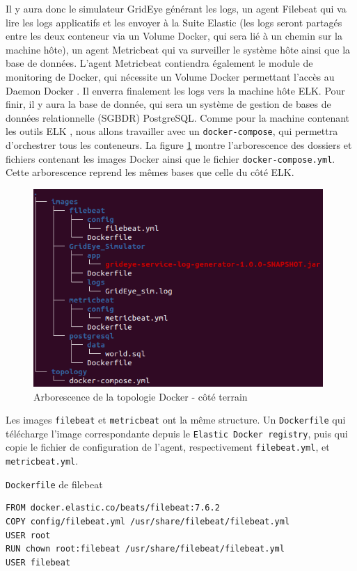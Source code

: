 \documentclass[paper=a4, fontsize=11pt]{scrartcl}
\begin{document}
Il y aura donc le simulateur GridEye générant les logs, un agent Filebeat qui va lire les logs applicatifs et les envoyer à la Suite Elastic (les logs seront partagés entre les deux conteneur via un Volume Docker, qui sera lié à un chemin sur la machine hôte), un agent Metricbeat qui va surveiller le système hôte ainsi que la base de données. L'agent Metricbeat contiendra également le module de monitoring de Docker, qui nécessite un Volume Docker permettant l'accès au \og Daemon Docker \fg. Il enverra finalement les logs vers la machine hôte ELK. Pour finir, il y aura la base de donnée, qui sera un système de gestion de bases de données relationnelle (SGBDR) PostgreSQL.
Comme pour la machine contenant les outils \og ELK \fg, nous allons travailler avec un \verb,docker-compose,, qui permettra d'orchestrer tous les conteneurs. La figure \ref{f-treeDockerField} montre l'arborescence des dossiers et fichiers contenant les images Docker ainsi que le fichier \verb,docker-compose.yml,. Cette arborescence reprend les mêmes bases que celle du côté ELK.

\begin{figure}[H]
    \centering
    \includegraphics[width=11cm]{img/screenshots/tree_docker_field.png}
    \caption{Arborescence de la topologie Docker - côté terrain}
    \label{f-treeDockerField}
\end{figure}

Les images \verb,filebeat, et \verb,metricbeat, ont la même structure. Un \verb,Dockerfile, qui télécharge l'image correspondante depuis le \verb,Elastic Docker registry,, puis qui copie le fichier de configuration de l'agent, respectivement \verb,filebeat.yml,, et \verb,metricbeat.yml,.

\verb,Dockerfile, de filebeat
\begin{lstlisting}
FROM docker.elastic.co/beats/filebeat:7.6.2
COPY config/filebeat.yml /usr/share/filebeat/filebeat.yml
USER root
RUN chown root:filebeat /usr/share/filebeat/filebeat.yml
USER filebeat
\end{lstlisting}
\end{document}
